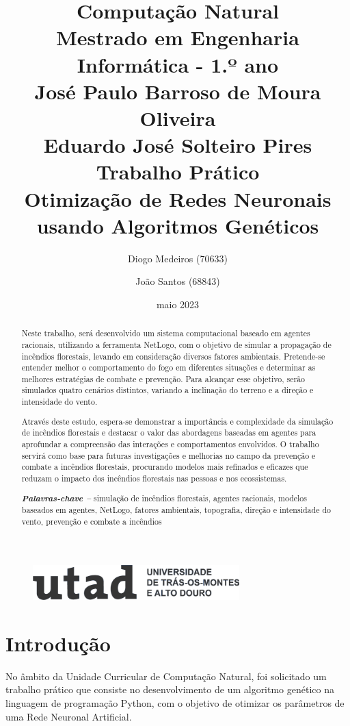 \documentclass[a4paper, portuguese]{report}
\title{{\textbf{Computação Natural}}\\ Mestrado em Engenharia Informática - 1.º ano\\\vspace*{1cm} José Paulo Barroso de Moura Oliveira\\ Eduardo José Solteiro Pires\\\vspace*{3cm}\textbf{Trabalho Prático}\\\vspace*{0.5cm} Otimização de Redes Neuronais usando Algoritmos Genéticos \vspace*{1cm}}
\author{Diogo Medeiros (70633) \and João Santos (68843)}
\date{maio 2023}
\providecommand{\keywords}[1]
{
  \small	
  \textbf{\textit{Palavras-chave --}} #1
}
\begin{document}
\begin{figure}
\includegraphics[width=8cm]{images/utad}
\label{fig:utad_logo}
\end{figure}

\maketitle

\begin{abstract}

Neste trabalho, será desenvolvido um sistema computacional baseado em agentes racionais, utilizando a ferramenta NetLogo, com o objetivo de simular a propagação de incêndios florestais, levando em consideração diversos fatores ambientais. Pretende-se entender melhor o comportamento do fogo em diferentes situações e determinar as melhores estratégias de combate e prevenção. Para alcançar esse objetivo, serão simulados quatro cenários distintos, variando a inclinação do terreno e a direção e intensidade do vento.

Através deste estudo, espera-se demonstrar a importância e complexidade da simulação de incêndios florestais e destacar o valor das abordagens baseadas em agentes para aprofundar a compreensão das interações e comportamentos envolvidos. O trabalho servirá como base para futuras investigações e melhorias no campo da prevenção e combate a incêndios florestais, procurando modelos mais refinados e eficazes que reduzam o impacto dos incêndios florestais nas pessoas e nos ecossistemas.

\keywords{simulação de incêndios florestais, agentes racionais, modelos baseados em agentes, NetLogo, fatores ambientais, topografia, direção e intensidade do vento, prevenção e combate a incêndios}

\end{abstract}

\tableofcontents
\listoffigures
\listoftables
\listofalgorithms

\chapter{Introdução}\label{chapter:introduction}
No âmbito da Unidade Curricular de Computação Natural, foi solicitado um trabalho prático que consiste no desenvolvimento de um algoritmo genético na linguagem de programação Python, com o objetivo de otimizar os parâmetros de uma Rede Neuronal Artificial.
\end{document}
